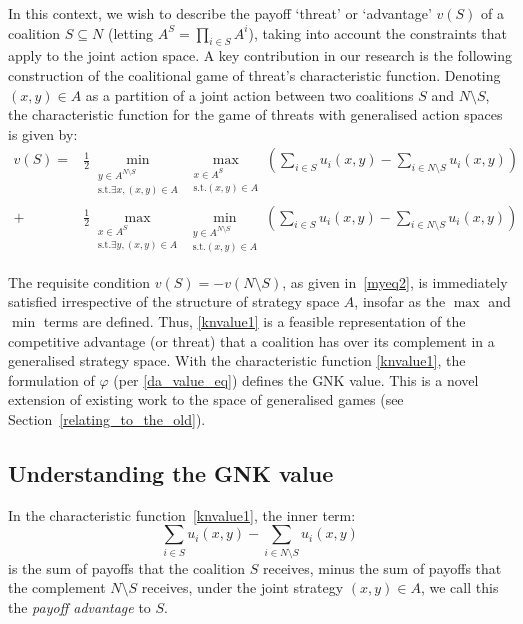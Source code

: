 In this context, we wish to describe the payoff `threat' or `advantage' $v(S)$ of a coalition $S\subseteq N$ (letting $A^S=\prod_{i\in S}A^i$), taking into account the constraints that apply to the joint action space.  
A key contribution in our research is the following construction of the coalitional game of threat's characteristic function. 
Denoting $(x,y)\in A$ as a partition of a joint action between two coalitions $S$ and $N\setminus S$, 
the characteristic function for the game of threats with generalised action spaces is given by:
\begin{align}
\label{knvalue1}
v(S) = &
\frac{1}{2}\min_{\substack{y\in A^{N\setminus S} \\ \text{s.t.}\exists x,(x,y)\in A}} 
\max_{\substack{x\in A^S \\ \text{s.t.}(x,y)\in A}}
	\left(\sum_{i\in S} u_i(x,y) - \sum_{i\in N\setminus S}u_i(x,y)\right)\nonumber\\
+&
\frac{1}{2}\max_{\substack{x\in A^S \\ \text{s.t.}\exists y,(x,y)\in A}}
\min_{\substack{y\in A^{N\setminus S} \\ \text{s.t.}(x,y)\in A}}
	\left(\sum_{i\in S} u_i(x,y) - \sum_{i\in N\setminus S} u_i(x,y) \right)
\end{align}

The requisite condition $v(S)=-v(N\setminus S)$, as given in~\eqref{myeq2}, is immediately satisfied irrespective of the structure of strategy space $A$, insofar as the $\max$ and $\min$ terms are defined.
Thus, \eqref{knvalue1} is a feasible representation of the competitive advantage (or threat) that a coalition has over its complement in a generalised strategy space.
With the characteristic function \eqref{knvalue1}, the formulation of $\varphi$ (per \eqref{da_value_eq}) defines the GNK value.
This is a novel extension of existing work to the space of generalised games (see Section~\ref{relating_to_the_old}).

\subsection{Understanding the GNK value}\label{the_value_def4}

In the characteristic function~\eqref{knvalue1}, the inner term:
\[
\sum_{i\in S} u_i(x,y) - \sum_{i\in N\setminus S} u_i(x,y)
\] 
is the sum of payoffs that the coalition $S$ receives, 
minus the sum of payoffs that the complement $N\setminus S$ receives, 
under the joint strategy $(x,y)\in A$, we call this the \textit{payoff advantage} to $S$.

